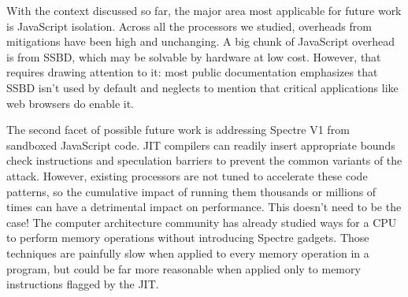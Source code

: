 With the context discussed so far, the major area most applicable for future work is JavaScript isolation.
Across all the processors we studied, overheads from mitigations have been high and unchanging.
A big chunk of JavaScript overhead is from SSBD, which may be solvable by hardware at low cost.
However, that requires drawing attention to it: most public documentation emphasizes that SSBD isn't used by default and neglects to mention that critical applications like web browsers do enable it.

The second facet of possible future work is addressing Spectre V1 from sandboxed JavaScript code.
JIT compilers can readily insert appropriate bounds check instructions and speculation barriers to prevent the common variants of the attack.
However, existing processors are not tuned to accelerate these code patterns, so the cumulative impact of running them thousands or millions of times can have a detrimental impact on performance.
This doesn't need to be the case!
The computer architecture community has already studied ways for a CPU to perform memory operations without introducing Spectre gadgets.
Those techniques are painfully slow when applied to every memory operation in a program, but could be far more reasonable when applied only to memory instructions flagged by the JIT.
